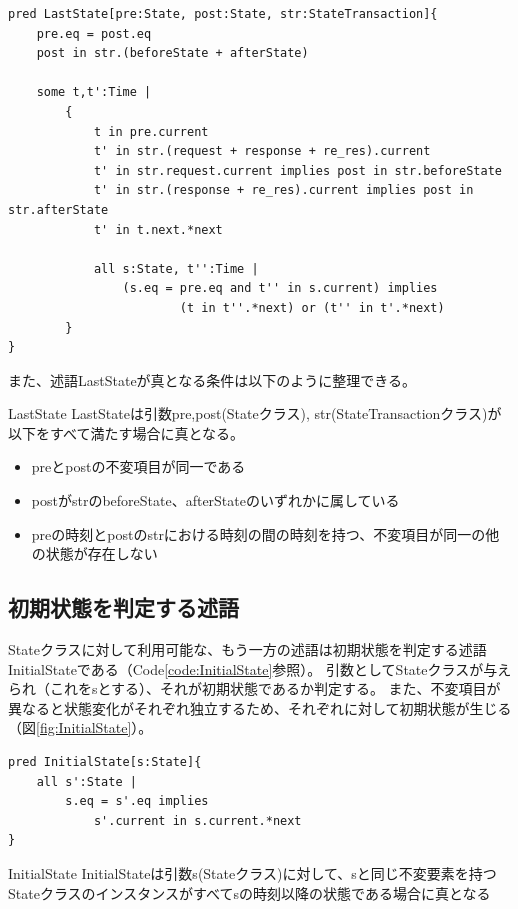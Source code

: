 \documentclass[journal]{IEEEtran}
\begin{document}
\begin{lstlisting}[caption=状態遷移において直前の状態を判定する述語, label=code:LastState]
pred LastState[pre:State, post:State, str:StateTransaction]{
	pre.eq = post.eq
	post in str.(beforeState + afterState)

	some t,t':Time |
		{
			t in pre.current
			t' in str.(request + response + re_res).current
			t' in str.request.current implies post in str.beforeState
			t' in str.(response + re_res).current implies post in str.afterState
			t' in t.next.*next

			all s:State, t'':Time |
				(s.eq = pre.eq and t'' in s.current) implies
						(t in t''.*next) or (t'' in t'.*next)
		}
}
\end{lstlisting}

また、述語LastStateが真となる条件は以下のように整理できる。
\begin{itembox}[l]{LastState}
LastStateは引数pre,post(Stateクラス), str(StateTransactionクラス)が以下をすべて満たす場合に真となる。
\begin{itemize}
\item preとpostの不変項目が同一である
\item postがstrのbeforeState、afterStateのいずれかに属している
\item preの時刻とpostのstrにおける時刻の間の時刻を持つ、不変項目が同一の他の状態が存在しない
\end{itemize}
\end{itembox}

\subsection{初期状態を判定する述語}
Stateクラスに対して利用可能な、もう一方の述語は初期状態を判定する述語InitialStateである（Code\ref{code:InitialState}参照）。
引数としてStateクラスが与えられ（これをsとする）、それが初期状態であるか判定する。
また、不変項目が異なると状態変化がそれぞれ独立するため、それぞれに対して初期状態が生じる（図\ref{fig:InitialState}）。
\begin{lstlisting}[caption=状態遷移において初期状態を判定する述語, label=code:InitialState]
pred InitialState[s:State]{
	all s':State |
		s.eq = s'.eq implies
			s'.current in s.current.*next
}
\end{lstlisting}

\begin{itembox}[l]{InitialState}
InitialStateは引数s(Stateクラス)に対して、sと同じ不変要素を持つStateクラスのインスタンスがすべてsの時刻以降の状態である場合に真となる
\end{itembox}
\end{document}
